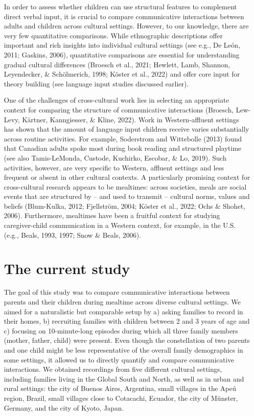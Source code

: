 \documentclass[
  man,floatsintext]{apa6}
\begin{document}
In order to assess whether children can use structural features to complement direct verbal input, it is crucial to compare communicative interactions between adults and children across cultural settings. However, to our knowledge, there are very few quantitative comparisons. While ethnographic descriptions offer important and rich insights into individual cultural settings (see e.g., De León, 2011; Gaskins, 2006), quantitative comparisons are essential for understanding gradual cultural differences (Broesch et al., 2021; Hewlett, Lamb, Shannon, Leyendecker, \& Schölmerich, 1998; Köster et al., 2022) and offer core input for theory building (see language input studies discussed earlier).

One of the challenges of cross-cultural work lies in selecting an appropriate context for comparing the structure of communicative interactions (Broesch, Lew-Levy, Kärtner, Kanngiesser, \& Kline, 2022). Work in Western-affluent settings has shown that the amount of language input children receive varies substantially across routine activities. For example, Soderstrom and Wittebolle (2013) found that Canadian adults spoke most during book reading and structured playtime (see also Tamis-LeMonda, Custode, Kuchirko, Escobar, \& Lo, 2019). Such activities, however, are very specific to Western, affluent settings and less frequent or absent in other cultural contexts. A particularly promising context for cross-cultural research appears to be mealtimes: across societies, meals are social events that are structured by -- and used to transmit -- cultural norms, values and beliefs (Blum-Kulka, 2012; Fjellström, 2004; Köster et al., 2022; Ochs \& Shohet, 2006). Furthermore, mealtimes have been a fruitful context for studying caregiver-child communication in a Western context, for example, in the U.S. (e.g., Beals, 1993, 1997; Snow \& Beals, 2006).

\hypertarget{the-current-study}{%
\section{The current study}\label{the-current-study}}

The goal of this study was to compare communicative interactions between parents and their children during mealtime across diverse cultural settings. We aimed for a naturalistic but comparable setup by a) asking families to record in their homes, b) recruiting families with children between 2 and 3 years of age and c) focusing on 10-minute-long episodes during which all three family members (mother, father, child) were present. Even though the constellation of two parents and one child might be less representative of the overall family demographics in some settings, it allowed us to directly quantify and compare communicative interactions. We obtained recordings from five different cultural settings, including families living in the Global South and North, as well as in urban and rural settings: the city of Buenos Aires, Argentina, small villages in the Apeú region, Brazil, small villages close to Cotacachi, Ecuador, the city of Münster, Germany, and the city of Kyoto, Japan.
\end{document}
